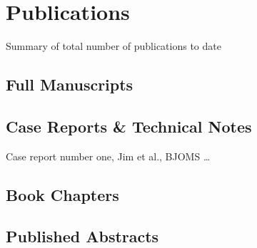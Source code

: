 \section{Publications}

Summary of total number of publications to date


\subsection{Full Manuscripts}


\subsection{Case Reports \& Technical Notes}

   Case report number one, Jim et al., BJOMS \ldots


\subsection{Book Chapters}

\subsection{Published Abstracts}
